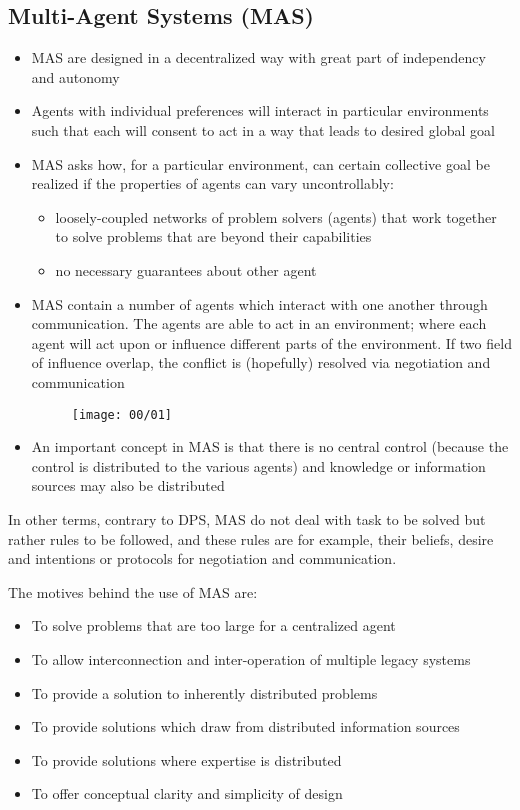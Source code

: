 \subsection{Multi-Agent Systems (MAS)}
\begin{itemize}
\item MAS are designed in a decentralized way with great part of independency and autonomy
\item Agents with individual preferences will interact in particular environments such that each will consent to act in a way that leads to desired global goal
\item MAS asks how, for a particular environment, can certain collective goal be realized if the properties of agents can vary uncontrollably:
\begin{itemize}
\item loosely-coupled networks of problem solvers (agents) that work together to solve problems that are beyond their capabilities
\item no necessary guarantees about other agent
\end{itemize}
\item MAS contain a number of agents which interact with one another through communication. The agents are able to act in an environment; where each agent will act upon or influence different parts of the environment. If two field of influence overlap, the conflict is (hopefully) resolved via negotiation and communication

\begin{figure}[!h]
\centering
\texttt{[image: 00/01]}
\end{figure}

\item An important concept in MAS is that there is no central control (because the control is distributed to the various agents) and knowledge or information sources may also be distributed
\end{itemize}

In other terms, contrary to DPS, MAS do not deal with task to be solved but rather rules to be followed, and these rules are for example, their beliefs, desire and intentions or protocols for negotiation and communication.

The motives behind the use of MAS are:
\begin{itemize}
\item To solve problems that are too large for a centralized agent
\item To allow interconnection and inter-operation of multiple legacy systems
\item To provide a solution to inherently distributed problems
\item To provide solutions which draw from distributed information sources
\item To provide solutions where expertise is distributed
\item To offer conceptual clarity and simplicity of design
\end{itemize}

